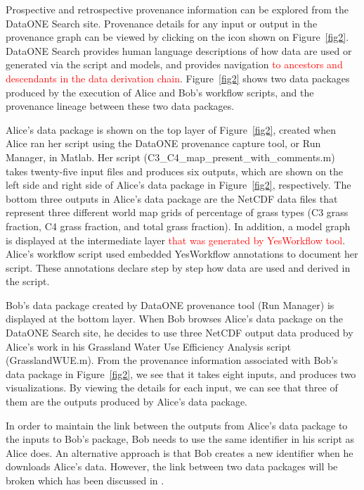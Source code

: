 \documentclass[a4paper]{llncs}
\begin{document}
Prospective and retrospective provenance information can be explored from the DataONE Search site. Provenance details for any input or output in the provenance graph can be viewed by clicking on the icon shown on Figure~\ref{fig2}. DataONE Search provides human language descriptions of how data are used or generated via the script and models, and provides navigation \textcolor{red}{to ancestors and descendants in the data derivation chain}. Figure~\ref{fig2} shows two data packages produced by the execution of Alice and Bob's workflow scripts, and the provenance lineage between these two data packages. 

Alice's data package \cite{yaxing} is shown on the top layer of Figure~\ref{fig2}, created when Alice ran her script using the DataONE provenance capture tool, or Run Manager, in Matlab. Her script (C3\_C4\_map\_present\_with\_comments.m) takes twenty-five input files and produces six outputs, which are shown on the left side and right side of Alice's data package in Figure~\ref{fig2}, respectively. The bottom three outputs in Alice's data package are the NetCDF data files that represent three different world map grids of percentage of grass types (C3 grass fraction, C4 grass fraction, and total grass fraction). In addition, a model graph is displayed at the intermediate layer \textcolor{red}{that was generated by YesWorkflow tool}\cite{yesworkflow}. Alice's workflow script used embedded YesWorkflow annotations to document her script. These annotations declare step by step how data are used and derived in the script. 


Bob's data package \cite{christopher} created by DataONE provenance tool (Run Manager) is displayed at the bottom layer. When Bob browses Alice's data package on the DataONE Search site, he decides to use three NetCDF output data produced by Alice's work in his Grassland Water Use Efficiency Analysis script (GrasslandWUE.m). From the provenance information associated with Bob's data package in Figure~\ref{fig2}, we see that it takes eight inputs, and produces two visualizations. By viewing the details for each input, we can see that three of them are the outputs produced by Alice's data package.  

In order to maintain the link between the outputs from Alice's data package to the inputs to Bob's package, Bob needs to use the same identifier in his script as Alice does. An alternative approach is that Bob creates a new identifier when he downloads Alice's data. However, the link between two data packages will be broken which has been discussed in \cite{missing-link}.  
\end{document}
